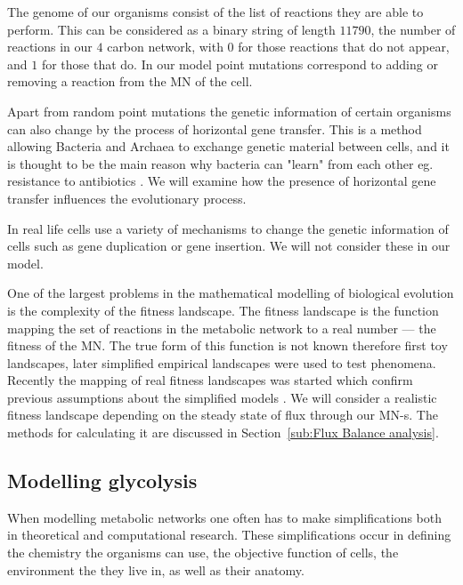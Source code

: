 \documentclass[a4paper,12pt]{article}
\begin{document}
	The genome of our organisms consist of the list of reactions they are able to perform. This can be considered as a binary string of length $11790$, the number of reactions in our $4$ carbon network, with $0$ for those reactions that do not appear, and $1$ for those that do. In our model point mutations correspond to adding or removing a reaction from the MN of the cell.

	Apart from random point mutations the genetic information of certain organisms can also change by the process of horizontal gene transfer. This is a method allowing Bacteria and Archaea to exchange genetic material between cells, and it is thought to be the main reason why bacteria can "learn" from each other eg. resistance to antibiotics \cite{horizontalAntibiotics,horizontalgenetransfer}. We will examine how the presence of horizontal gene transfer influences the evolutionary process.

	In real life cells use a variety of mechanisms to change the genetic information of cells such as gene duplication or gene insertion. We will not consider these in our model. 


	One of the largest problems in the mathematical modelling of biological evolution is the complexity of the fitness landscape. The fitness landscape is the function mapping the set of reactions in the metabolic network to a real number --- the fitness of the MN. The true form of this function is not known therefore first toy landscapes, later simplified empirical landscapes were used to test phenomena. Recently the mapping of real fitness landscapes was started which confirm previous assumptions about the simplified models \cite{fitnesslandscape}. We will consider a realistic fitness landscape depending on the steady state of flux through our MN-s. The methods for calculating it are discussed in Section~\ref{sub:Flux Balance analysis}.

	\subsection{Modelling glycolysis}
	\label{sub:artificial_chemistries}


	When modelling metabolic networks one often has to make simplifications both in theoretical and computational research. These simplifications occur in defining the chemistry the organisms can use, the objective function of cells, the environment the they live in, as well as their anatomy. %
	
\end{document}
